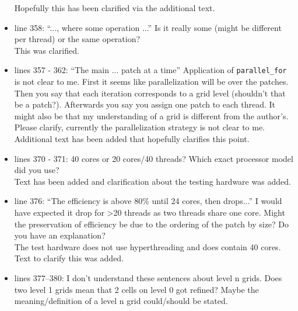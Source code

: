\documentclass{letter}
\begin{document}
\begin{letter}
\begin{itemize}
    Hopefully this has been clarified via the additional text. \\

    \item line 358:  ``..., where some operation ...'' Is it really some (might be
    different per thread) or the same operation? \\

    This was clarified. \\

    \item lines 357 - 362:  ``The main ... patch at a time'' Application of
    \texttt{parallel\_for} is not clear to me. First it seems like
    parallelization will be over the patches. Then you say that each iteration
    corresponds to a grid level (shouldn't that be a patch?). Afterwards you say
    you assign one patch to each thread. It might also be that my understanding
    of a grid is different from the author's. Please clarify, currently the
    parallelization strategy is not clear to me. \\

    Additional text has been added that hopefully clarifies this point. \\

    \item lines 370 - 371: 40 cores or 20 cores/40 threads? Which exact processor
    model did you use? \\

    Text has been added and clarification about the testing hardware was added.
    \\

    \item line 376: ``The efficiency is above 80\% until 24 cores, then drops...'' 
    I would have expected it drop for >20 threads as two threads share one core.
    Might the preservation of efficiency be due to the ordering of the patch by
    size? Do you have an explanation? \\

    The test hardware does not use hyperthreading and does contain 40 cores. 
    Text to clarify this was added. \\

    \item lines 377--380:  I don't understand these sentences about level n grids.
    Does two level 1 grids mean that 2 cells on level 0 got refined? Maybe the
    meaning/definition of a level n grid could/should be stated. \\


\end{itemize}
\end{letter}
\end{document}
